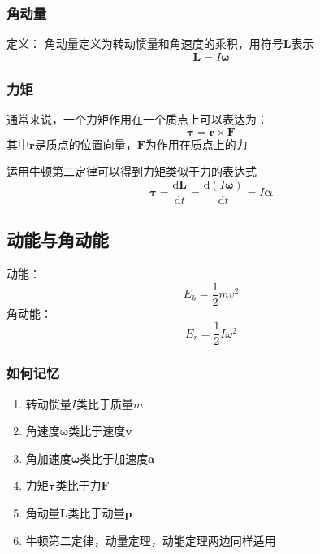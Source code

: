 \documentclass[a4paper,oneside,11pt]{article}
\newcommand{\bol}[1]{\textbf{#1}}
\newcommand{\diff}{\mathrm{d}}
\begin{document}
\subsubsection{角动量}
定义： 角动量定义为转动惯量和角速度的乘积，用符号$\bol{L}$表示
\begin{displaymath}
	\bol{L} = I\boldsymbol{\omega}
\end{displaymath}
\subsubsection{力矩}
通常来说，一个力矩作用在一个质点上可以表达为：
\begin{displaymath}
	\boldsymbol{\tau} = \bol{r}\times\bol{F}
\end{displaymath}
其中$\bol{r}$是质点的位置向量，$\bol{F}$为作用在质点上的力
\par 运用牛顿第二定律可以得到力矩类似于力的表达式
\begin{displaymath}
	\boldsymbol{\tau} = \frac{\diff \bol{L}}{\diff t} = \frac{\diff (I\boldsymbol{\omega})}{\diff t} = I\boldsymbol{\alpha}
\end{displaymath}
\subsection{动能与角动能}
动能：
\begin{displaymath}
	E_k = \frac{1}{2}mv^2
\end{displaymath}
角动能：
\begin{displaymath}
	E_r = \frac{1}{2}I\omega^2
\end{displaymath}
\subsubsection{如何记忆}
\begin{enumerate}
	\item 转动惯量$I$类比于质量$m$
	\item 角速度$\boldsymbol{\omega}$类比于速度$\bol{v}$
	\item 角加速度$\boldsymbol{\omega}$类比于加速度$\bol{a}$
	\item 力矩$\boldsymbol{\tau}$类比于力$\bol{F}$
	\item 角动量$\bol{L}$类比于动量$\bol{p}$
	\item 牛顿第二定律，动量定理，动能定理两边同样适用
\end{enumerate}
\end{document}
